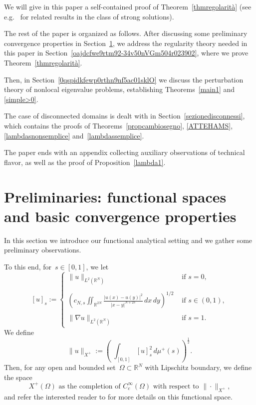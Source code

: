 \documentclass[12pt,a4paper,intlimits,sumlimits]{amsart}
\def \R {\mathbb{R}}
\theoremstyle{definition}
\theoremstyle{plain}
\numberwithin{equation}{section}
\begin{document}
We will give in this paper a self-contained proof of Theorem~\ref{thmregolarità}
(see e.g.~\cite[Theorem~3.1.19]{MR1911531}
for related results in the class of strong solutions).\medskip

The rest of the paper is organized as follows. After discussing
some preliminary convergence properties in Section~\ref{oajdcfwe9rtm92-34v50nVGm504r02390},
we address the regularity theory needed in this paper in Section~\ref{oajdcfwe9rtm92-34v50nVGm504r023902},
where we prove Theorem~\ref{thmregolarità}.

Then, in Section~\ref{0qspidkfewp0rthn9nf5ac01sklO}
we discuss the perturbation theory of nonlocal eigenvalue problems,
establishing Theorems~\ref{main1} and \ref{simple>0}.

The case of disconnected domains is dealt with in Section~\ref{sezionedisconnessi},
which contains the proofs of
Theorems~\ref{propcambiosegno}, \ref{ATTEHAMS},
\ref{lambdasnonsemplice}
and~\ref{lambdassemplice}.

The paper ends with an appendix collecting auxiliary observations
of technical flavor, as well as the proof of Proposition~\ref{lambda1}.

\section{Preliminaries: functional spaces and basic convergence properties}\label{oajdcfwe9rtm92-34v50nVGm504r02390}
In this section we introduce our functional analytical setting and we gather some preliminary observations.

To this end, for~$s\in[0,1]$, we let
\begin{equation}\label{seminormgagliardo}
[u]_s:=
\begin{cases}
\|u\|_{L^2(\R^N)}  &\mbox{ if } s=0,
\\ \\
\displaystyle\left(c_{N,s}\iint_{\R^{2N}}\frac{|u(x)-u(y)|^2}{|x-y|^{N+2s}}\,dx\,dy \right)^{1/2} &\mbox{ if } s\in(0,1),
\\ \\
\|\nabla u\|_{L^2(\R^N)}  &\mbox{ if } s=1.
\end{cases}
\end{equation}
We define 
\begin{equation}\label{normadefinizione}
\|u\|_{X^+}:=\left(\;\int_{[0,1]}[u]^2_s\,d\mu^+(s)\right)^{\frac12}.
\end{equation}
Then, for any open and bounded set~$\Omega\subset\R^N$ with Lipschitz boundary, we define the space 
\begin{equation}\label{X+Omegadefn}
X^+(\Omega) \mbox{ as the completion of $C^\infty_c(\Omega)$ with respect to $\|\cdot\|_{X^+}$},
\end{equation}
and refer the interested reader to \cite{DPLSVlog} for more details on this functional space.
\end{document}
